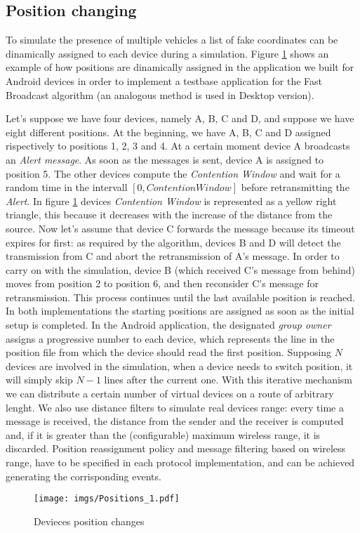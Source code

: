 \subsection{Position changing}
\label{sec:position_change}

To simulate the presence of multiple vehicles a list of fake coordinates can be dinamically assigned to each device during a simulation. Figure \ref{fig:positions} shows an example of how positions are dinamically assigned in the application we built for Android devices in order to implement a testbase application for the Fast Broadcast algorithm (an analogous method is used in Desktop version).

Let's suppose we have four devices, namely A, B, C and D, and suppose we have eight different positions. At the beginning, we have A, B, C and D assigned rispectively to positions 1, 2, 3 and 4. At a certain moment device A broadcasts an \emph{Alert message}. As soon as the messages is sent, device A is assigned to position 5. The other devices compute the \textit{Contention Window} and wait for a random time in the intervall $[0,Contention Window]$ before retransmitting the \emph{Alert}. In figure \ref{fig:positions} devices \textit{Contention Window} is represented as a yellow right triangle, this because it decreases with the increase of the distance from the source. Now let's assume that device C forwards the message because its timeout expires for first: as required by the algorithm, devices B and D will detect the transmission from C and abort the retransmission of A's message. In order to carry on with the simulation, device B (which received C's message from behind) moves from position 2 to position 6, and then reconsider C's message for retransmission. This process continues until the last available position is reached.
In both implementations the starting positions are assigned as soon as the initial setup is completed. In the Android application, the designated \textit{group owner} assigns a progressive number to each device, which represents the line in the position file from which the device should read the first position. Supposing $N$ devices are involved in the simulation, when a device needs to switch position, it will simply skip $N-1$ lines after the current one.
With this iterative mechanism we can distribute a certain number of virtual devices on a route of arbitrary lenght. 
We also use distance filters to simulate real devices range: every time a message is received, the distance from the sender and the receiver is computed and, if it is greater than the (configurable) maximum wireless range, it is discarded.
Position reassignment policy and message filtering based on wireless range, have to be specified in each protocol implementation, and can be achieved generating the corrisponding events.

\begin{figure}[htbp]
\centering
\texttt{[image: imgs/Positions\_1.pdf]}
\caption{Devieces position changes}
\label{fig:positions}
\end{figure}
